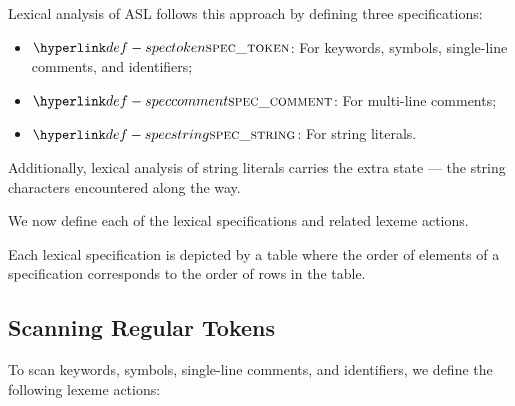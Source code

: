 Lexical analysis of ASL follows this approach by defining three specifications:
\begin{itemize}
  \item $\spectoken$: For keywords, symbols, single-line comments, and identifiers;
  \item $\speccomment$: For multi-line comments;
  \item $\specstring$: For string literals.
\end{itemize}

Additionally, lexical analysis of string literals carries the extra state ---
the string characters encountered along the way.

We now define each of the lexical specifications and related lexeme actions.

Each lexical specification is depicted by a table where the order of elements
of a specification corresponds to the order of rows in the table.

\subsection{Scanning Regular Tokens}
To scan keywords, symbols, single-line comments, and identifiers,
we define the following lexeme actions:


